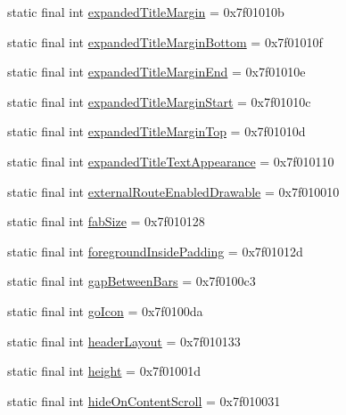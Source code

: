 \begin{CompactItemize}
\item 
static final int \hyperlink{classandroid_1_1support_1_1mediacompat_1_1_r_1_1attr_2a00a60276062145d00306849b41c972}{expandedTitleMargin} = 0x7f01010b
\item 
static final int \hyperlink{classandroid_1_1support_1_1mediacompat_1_1_r_1_1attr_392f3a1df805af23c1566042c9805ac5}{expandedTitleMarginBottom} = 0x7f01010f
\item 
static final int \hyperlink{classandroid_1_1support_1_1mediacompat_1_1_r_1_1attr_6f8f0c92176fe4e9c87894da330e69e7}{expandedTitleMarginEnd} = 0x7f01010e
\item 
static final int \hyperlink{classandroid_1_1support_1_1mediacompat_1_1_r_1_1attr_e549f021cfdcbfdd443719ed71e73fd8}{expandedTitleMarginStart} = 0x7f01010c
\item 
static final int \hyperlink{classandroid_1_1support_1_1mediacompat_1_1_r_1_1attr_1dd96e9ba7ef065f3d11cd6d6c8136f1}{expandedTitleMarginTop} = 0x7f01010d
\item 
static final int \hyperlink{classandroid_1_1support_1_1mediacompat_1_1_r_1_1attr_3a0f1ba5754e14337714751b8b66dc62}{expandedTitleTextAppearance} = 0x7f010110
\item 
static final int \hyperlink{classandroid_1_1support_1_1mediacompat_1_1_r_1_1attr_1c1bdd7c2fc84220d0b27a6b829711fc}{externalRouteEnabledDrawable} = 0x7f010010
\item 
static final int \hyperlink{classandroid_1_1support_1_1mediacompat_1_1_r_1_1attr_e5d587e84d8e9cbde78d75ac01ca8bd6}{fabSize} = 0x7f010128
\item 
static final int \hyperlink{classandroid_1_1support_1_1mediacompat_1_1_r_1_1attr_422861e2b84a2dc4cfb0cd273743fa14}{foregroundInsidePadding} = 0x7f01012d
\item 
static final int \hyperlink{classandroid_1_1support_1_1mediacompat_1_1_r_1_1attr_4ad76826cb35a8728a15d5521121268c}{gapBetweenBars} = 0x7f0100c3
\item 
static final int \hyperlink{classandroid_1_1support_1_1mediacompat_1_1_r_1_1attr_407fd7c20340fa4e78a3b9f39242477a}{goIcon} = 0x7f0100da
\item 
static final int \hyperlink{classandroid_1_1support_1_1mediacompat_1_1_r_1_1attr_d6ea1a0c72ebc9ce782da13da9794211}{headerLayout} = 0x7f010133
\item 
static final int \hyperlink{classandroid_1_1support_1_1mediacompat_1_1_r_1_1attr_f16f5f895926e3a1228062e2d7a31fcf}{height} = 0x7f01001d
\item 
static final int \hyperlink{classandroid_1_1support_1_1mediacompat_1_1_r_1_1attr_5c53bb2ad5cda2510371521ee677b308}{hideOnContentScroll} = 0x7f010031

\end{CompactItemize}
